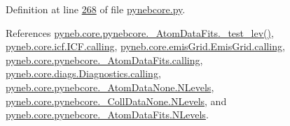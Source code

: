 Definition at line \hyperlink{pynebcore_8py_source_l00268}{268} of file \hyperlink{pynebcore_8py_source}{pynebcore.\+py}.



References \hyperlink{pynebcore_8py_source_l00171}{pyneb.\+core.\+pynebcore.\+\_\+\+Atom\+Data\+Fits.\+\_\+test\+\_\+lev()}, \hyperlink{icf_8py_source_l00016}{pyneb.\+core.\+icf.\+I\+C\+F.\+calling}, \hyperlink{emis_grid_8py_source_l00041}{pyneb.\+core.\+emis\+Grid.\+Emis\+Grid.\+calling}, \hyperlink{pynebcore_8py_source_l00090}{pyneb.\+core.\+pynebcore.\+\_\+\+Atom\+Data\+Fits.\+calling}, \hyperlink{diags_8py_source_l00169}{pyneb.\+core.\+diags.\+Diagnostics.\+calling}, \hyperlink{pynebcore_8py_source_l00062}{pyneb.\+core.\+pynebcore.\+\_\+\+Atom\+Data\+None.\+N\+Levels}, \hyperlink{pynebcore_8py_source_l00075}{pyneb.\+core.\+pynebcore.\+\_\+\+Coll\+Data\+None.\+N\+Levels}, and \hyperlink{pynebcore_8py_source_l00155}{pyneb.\+core.\+pynebcore.\+\_\+\+Atom\+Data\+Fits.\+N\+Levels}.


